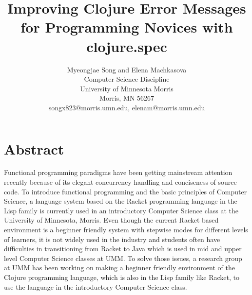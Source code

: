 \documentclass[12pt]{article}
\newcommand{\comment}[1]{{\bf \tt  {#1}}}
\begin{document}
\pagestyle{plain}
%

\title{Improving Clojure Error Messages for Programming Novices with clojure.spec}
%
%

\author{
Myeongjae Song and Elena Machkasova \\
Computer Science Discipline \\
University of Minnesota Morris\\
Morris, MN 56267\\
songx823@morris.umn.edu, elenam@morris.umn.edu
}
\date{}
\maketitle
\thispagestyle{empty}

\section*{\centering Abstract}
Functional programming paradigms have been getting mainstream attention recently because of its elegant concurrency 
handling and conciseness of source code. To introduce functional programming and the basic principles of Computer 
Science, a language system based on the Racket programming language in the Lisp family is currently used in an introductory 
Computer Science class at the University of Minnesota, Morris. Even though the current Racket based environment is a 
beginner friendly system with stepwise modes for different levels of learners, it is not widely used in the industry and 
students often have difficulties in transitioning from Racket to Java which is used in mid and upper level Computer Science 
classes at UMM. To solve those issues, a research group at UMM has been working on making a beginner friendly environment 
of the Clojure programming language, which is also in the Lisp family like Racket, to use the language in the introductory 
Computer Science class.
\end{document}

